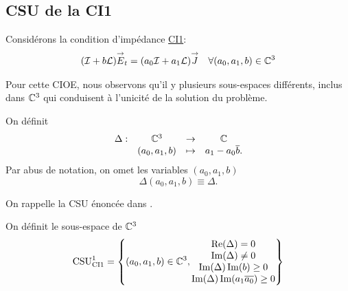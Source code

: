   \subsection{CSU de la CI1}

    Considérons la condition d’impédance \hyperlink{ci1}{CI1}:
    \begin{align}
    \label{eq:unicite:ci1}
      (\oI + b \LL) \vE_t = (a_0\oI + a_1 \LL) \vJ && \forall (a_0, a_1,b) \in \CC^3
    \end{align}

    Pour cette CIOE, nous observons qu'il y plusieurs sous-espaces différents, inclus dans \(\CC^3\) qui conduisent à l'unicité de la solution du problème.


    On définit 
    \begin{equation}
      \label{eq:unicite:delta}
      \begin{matrix}
        \Delta: & \CC^3 &\rightarrow& \CC
        \\
        & (a_0,a_1,b) & \mapsto & a_1 - a_0\conj{b}.
      \end{matrix}
    \end{equation}
    Par abus de notation, on omet les variables \((a_0,a_1,b)\)
    \begin{equation}
       \Delta(a_0,a_1,b) \equiv \Delta.
    \end{equation}

    On rappelle la CSU énoncée dans \cite{stupfel_sufficient_2011}.

    \begin{defn}
      \label{def:csu:ci1-1}

      On définit le sous-espace de \(\CC^3\)
      \begin{equation*}
        \CSU[1]{CI1} = \left\lbrace 
        (a_0,a_1,b) \in \CC^3,
        \begin{matrix}
        \Re(\Delta) = 0
        \\
        \Im(\Delta) \not = 0
        \\
        \Im(\Delta)\Im(b) \ge 0
        \\
        \Im(\Delta )\Im(a_1\conj{a_0})\ge 0
        \end{matrix}
        \right\rbrace
      \end{equation*}
    \end{defn}

